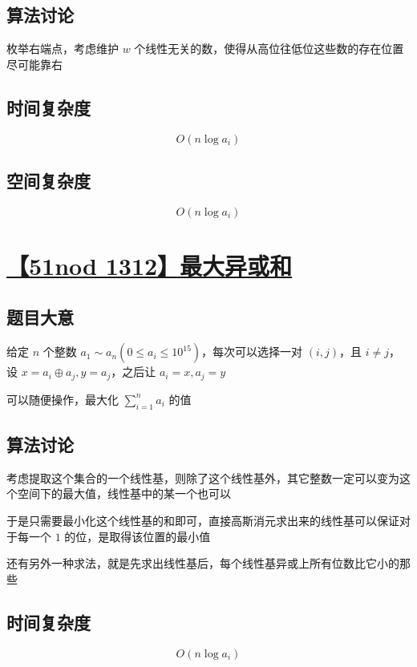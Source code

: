 \documentclass[UTF8]{article}
\begin{document}
\subsection{算法讨论}

枚举右端点，考虑维护 $w$ 个线性无关的数，使得从高位往低位这些数的存在位置尽可能靠右

\subsection{时间复杂度}

$$
O(n \log a_i)
$$

\subsection{空间复杂度}

$$
O(n \log a_i)
$$

\section{\href{http://www.51nod.com/Challenge/Problem.html?problemId=1312}{【51nod 1312】最大异或和}}

\subsection{题目大意}

给定 $n$ 个整数 $a_1 \sim a_n(0 \le a_i \le 10^{15})$，每次可以选择一对 $(i,j)$，且 $i \not= j$，设 $x=a_i \oplus a_j, y=a_j$，之后让 $a_i=x,a_j=y$

可以随便操作，最大化 $\sum_{i=1}^{n}a_i$ 的值

\subsection{算法讨论}

考虑提取这个集合的一个线性基，则除了这个线性基外，其它整数一定可以变为这个空间下的最大值，线性基中的某一个也可以

于是只需要最小化这个线性基的和即可，直接高斯消元求出来的线性基可以保证对于每一个 $1$ 的位，是取得该位置的最小值

还有另外一种求法，就是先求出线性基后，每个线性基异或上所有位数比它小的那些

\subsection{时间复杂度}

$$
O(n \log a_i)
$$
\end{document}
